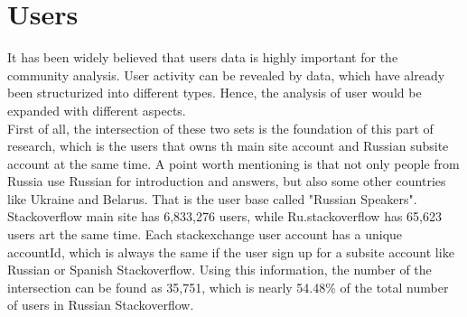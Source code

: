 \documentclass{article}
\begin{document}
	
\newpage
\section{Users}
It has been widely believed that users data is highly important for the community analysis. User activity can be revealed by data, which have already been structurized into different types. Hence, the analysis of user would be expanded with different aspects.
\\First of all, the intersection of these two sets is the foundation of this part of research, which is the users that owns th main site account and Russian subsite account at the same time. A point worth mentioning is that not only people from Russia use Russian for introduction and answers, but also some other countries like Ukraine and Belarus. That is the user base called "Russian Speakers".
\\Stackoverflow main site has 6,833,276 users, while Ru.stackoverflow has 65,623 users art the same time. Each stackexchange user account has a unique accountId, which is always the same if the user sign up for a subsite account like Russian or Spanish Stackoverflow. Using this information, the number of the intersection can be found as 35,751, which is nearly 54.48\% of the total number of users in Russian Stackoverflow. 
\end{document}
